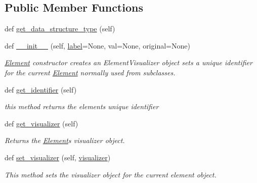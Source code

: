 \subsection*{Public Member Functions}
\begin{DoxyCompactItemize}
\item 
def \mbox{\hyperlink{classbridges_1_1element_1_1_element_a87b8c79123d20eb2af48ae4e4f1bcf32}{get\+\_\+data\+\_\+structure\+\_\+type}} (self)
\item 
def \mbox{\hyperlink{classbridges_1_1element_1_1_element_a31faee32348c800860f32876b6865ad0}{\+\_\+\+\_\+init\+\_\+\+\_\+}} (self, \mbox{\hyperlink{classbridges_1_1element_1_1_element_a97551dbb005cd5d1f13b65461290c6e3}{label}}=None, val=None, original=None)
\begin{DoxyCompactList}\small\item\em \mbox{\hyperlink{classbridges_1_1element_1_1_element}{Element}} constructor creates an Element\+Visualizer object sets a unique identifier for the current \mbox{\hyperlink{classbridges_1_1element_1_1_element}{Element}} normally used from subclasses. \end{DoxyCompactList}\item 
def \mbox{\hyperlink{classbridges_1_1element_1_1_element_acdb6d4aac75332d8bd3e9dbec47f1e7d}{get\+\_\+identifier}} (self)
\begin{DoxyCompactList}\small\item\em this method returns the element\textquotesingle{}s unique identifier \end{DoxyCompactList}\item 
def \mbox{\hyperlink{classbridges_1_1element_1_1_element_aee2ee2c8445790a6c60f2377964896cb}{get\+\_\+visualizer}} (self)
\begin{DoxyCompactList}\small\item\em Returns the \mbox{\hyperlink{classbridges_1_1element_1_1_element}{Element}}\textquotesingle{}s visualizer object. \end{DoxyCompactList}\item 
def \mbox{\hyperlink{classbridges_1_1element_1_1_element_a9aedfbef600fe7b97f84ae0a8ec1f8fa}{set\+\_\+visualizer}} (self, \mbox{\hyperlink{classbridges_1_1element_1_1_element_a86b560e1c213852ad2e99131f0f1e914}{visualizer}})
\begin{DoxyCompactList}\small\item\em This method sets the visualizer object for the current element object. \end{DoxyCompactList}\item 

\end{DoxyCompactItemize}

